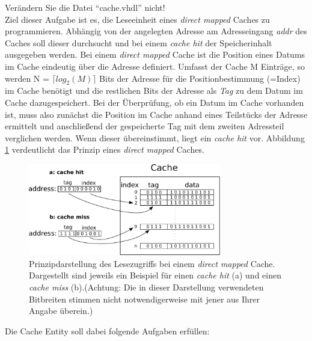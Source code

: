 \documentclass[a4paper,12pt]{article}
\begin{document}
Ver\"andern Sie die Datei "`cache.vhdl"' nicht!\\




Ziel dieser Aufgabe ist es, die Leseeinheit eines \textit{direct mapped} Caches zu programmieren. Abh\"angig von der angelegten Adresse am Adresseingang \textit{addr} des Caches soll dieser durchsucht und bei einem \textit{cache hit} der Speicherinhalt ausgegeben werden. Bei einem \textit{direct mapped} Cache ist die Position eines Datums im Cache eindeutig \"uber die Adresse definiert. Umfasst der Cache M Eintr\"age, so werden N = $\lceil log_2(M) \rceil$ Bits der Adresse f\"ur die Positionbestimmung (=Index) im Cache ben\"otigt und die restlichen Bits der Adresse als \textit{Tag} zu dem Datum im Cache dazugespeichert. Bei der \"Uberpr\"ufung, ob ein Datum im Cache vorhanden ist, muss also zun\"achst die Position im Cache anhand eines Teilst\"ucks der Adresse ermittelt und anschlie{\ss}end der gespeicherte Tag mit dem zweiten Adressteil verglichen werden. Wenn dieser \"ubereinstimmt, liegt ein \textit{cache hit} vor. Abbildung \ref{img_cache} verdeutlicht das Prinzip eines \textit{direct mapped} Caches. \\

\begin{figure}[h]
\begin{center}
\includegraphics[width=0.75\textwidth]{../static/cache.pdf}
\caption{Prinzipdarstellung des Lesezugriffs bei einem \textit{direct mapped} Cache. Dargestellt sind jeweils ein Beispiel f\"ur einen \textit{cache hit} (a) und einen \textit{cache miss} (b).\newline (Achtung: Die in dieser Darstellung verwendeten Bitbreiten stimmen nicht notwendigerweise mit jener aus Ihrer Angabe \"uberein.)}
\label{img_cache}
\end{center}
\end{figure}

Die Cache Entity soll dabei folgende Aufgaben erf\"ullen:
\end{document}
